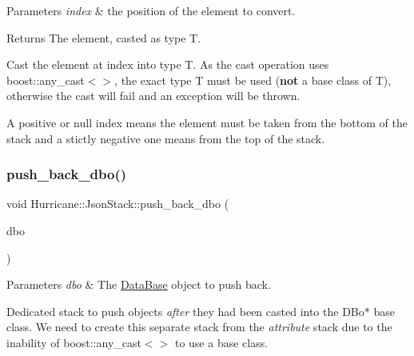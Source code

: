 \begin{DoxyParams}{Parameters}
{\em index} & the position of the element to convert. \\
\hline
\end{DoxyParams}
\begin{DoxyReturn}{Returns}
The element, casted as type T.
\end{DoxyReturn}
Cast the element at {\ttfamily index} into type T. As the cast operation uses {\ttfamily boost\+::any\+\_\+cast$<$$>$}, the exact type {\ttfamily T} must be used ({\bfseries not} a base class of {\ttfamily T}), otherwise the cast will fail and an exception will be thrown.

A positive or null index means the element must be taken from the bottom of the stack and a stictly negative one means from the top of the stack. \mbox{\label{classHurricane_1_1JsonStack_ab949c42fe63dcaad6a8e23954167a9a7}} 
\subsubsection{\texorpdfstring{push\+\_\+back\+\_\+dbo()}{push\_back\_dbo()}}
{\footnotesize\ttfamily void Hurricane\+::\+Json\+Stack\+::push\+\_\+back\+\_\+dbo (\begin{DoxyParamCaption}\item[{\mbox{\hyperlink{classHurricane_1_1DBo}{D\+Bo}} $\ast$}]{dbo }\end{DoxyParamCaption})\hspace{0.3cm}{\ttfamily [inline]}}


\begin{DoxyParams}{Parameters}
{\em dbo} & The \mbox{\hyperlink{classHurricane_1_1DataBase}{Data\+Base}} object to push back.\\
\hline
\end{DoxyParams}
Dedicated stack to push objects {\itshape after} they had been casted into the D\+Bo$\ast$ base class. We need to create this separate stack from the {\itshape attribute} stack due to the inability of {\ttfamily boost\+::any\+\_\+cast$<$$>$} to use a base class. \mbox{\label{classHurricane_1_1JsonStack_adeeb2a0300fa248f1f3bff38c4095630}} 

